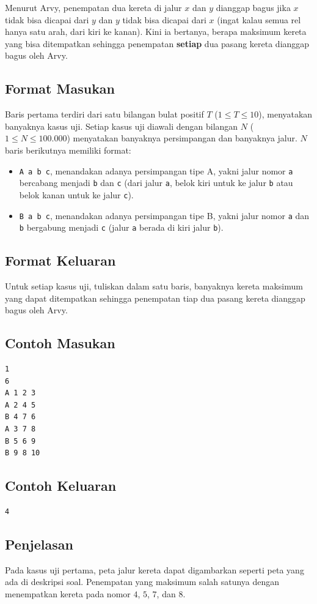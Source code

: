 \documentclass{article}
\begin{document}
Menurut Arvy, penempatan dua kereta di jalur $x$ dan $y$ dianggap bagus jika $x$ tidak bisa dicapai dari $y$ dan $y$ tidak bisa dicapai dari $x$ (ingat kalau semua rel hanya satu arah, dari kiri ke kanan).
Kini ia bertanya, berapa maksimum kereta yang bisa ditempatkan sehingga penempatan \textbf{setiap} dua pasang kereta dianggap bagus oleh Arvy.

\subsection*{Format Masukan}
Baris pertama terdiri dari satu bilangan bulat positif $T$ ($1 \leq T \leq 10$), menyatakan banyaknya kasus uji.
Setiap kasus uji diawali dengan bilangan $N$ ($1 \leq N \leq 100.000$) menyatakan banyaknya persimpangan dan banyaknya jalur.
$N$ baris berikutnya memiliki format:
\begin{itemize}
    \setlength{\itemsep}{0pt}
    \item \lstinline{A a b c}, menandakan adanya persimpangan tipe A, yakni jalur nomor \lstinline{a} bercabang menjadi \lstinline{b} dan \lstinline{c} (dari jalur \lstinline{a}, belok kiri untuk ke jalur \lstinline{b} atau belok kanan untuk ke jalur \lstinline{c}).
    \item \lstinline{B a b c}, menandakan adanya persimpangan tipe B, yakni jalur nomor \lstinline{a} dan \lstinline{b} bergabung menjadi \lstinline{c} (jalur \lstinline{a} berada di kiri jalur \lstinline{b}).
\end{itemize}

\subsection*{Format Keluaran}
Untuk setiap kasus uji, tuliskan dalam satu baris, banyaknya kereta maksimum yang dapat ditempatkan sehingga penempatan tiap dua pasang kereta dianggap bagus oleh Arvy.

\pagebreak

\begin{multicols}{2}
\subsection*{Contoh Masukan}
\begin{lstlisting}
1
6
A 1 2 3
A 2 4 5
B 4 7 6
A 3 7 8
B 5 6 9
B 9 8 10
\end{lstlisting}
\columnbreak
\subsection*{Contoh Keluaran}
\begin{lstlisting}
4
\end{lstlisting}
\vfill
\null
\end{multicols}

\subsection*{Penjelasan}
Pada kasus uji pertama, peta jalur kereta dapat digambarkan seperti peta yang ada di deskripsi soal. Penempatan yang maksimum salah satunya dengan menempatkan kereta pada nomor $4$, $5$, $7$, dan $8$.
\end{document}
